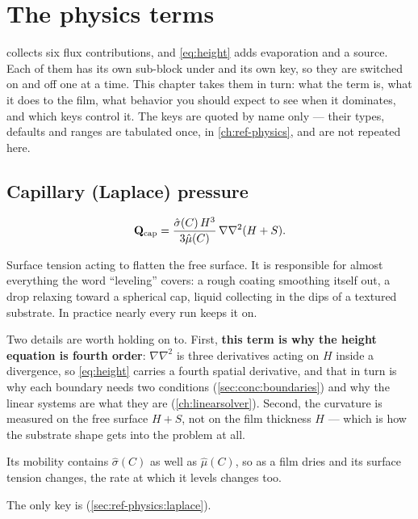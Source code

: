 \chapter{The physics terms}
\label{ch:terms}

 collects six flux contributions, and \cref{eq:height} adds
evaporation and a source. Each of them has its own sub-block under
 and its own  key, so they are switched on and off one
at a time. This chapter takes them in turn: what the term is, what it does to
the film, what behavior you should expect to see when it dominates, and which
keys control it. The keys are quoted by name only --- their types, defaults and
ranges are tabulated once, in \cref{ch:ref-physics}, and are not repeated here.

\section{Capillary (Laplace) pressure}
\label{sec:terms:laplace}

\begin{equation}\label{eq:q-cap}
  \mathbf{Q}_{\mathrm{cap}}
    = \frac{\hat{\sigma}(C)\,H^{3}}{3\hat{\mu}(C)}\,\nabla\nabla^{2}(H+S).
\end{equation}

Surface tension acting to flatten the free surface. It is responsible for
almost everything the word ``leveling'' covers: a rough coating smoothing
itself out, a drop relaxing toward a spherical cap, liquid collecting in the
dips of a textured substrate. In practice nearly every run keeps it on.

Two details are worth holding on to. First, \textbf{this term is why the height
equation is fourth order}: $\nabla\nabla^{2}$ is three derivatives acting on
$H$ inside a divergence, so \cref{eq:height} carries a fourth spatial
derivative, and that in turn is why each boundary needs two conditions
(\cref{sec:conc:boundaries}) and why the linear systems are what they are
(\cref{ch:linearsolver}). Second, the curvature is measured on the free surface
$H+S$, not on the film thickness $H$ --- which is how the substrate shape gets
into the problem at all.

Its mobility contains $\hat{\sigma}(C)$ as well as $\hat{\mu}(C)$, so as a film
dries and its surface tension changes, the rate at which it levels changes too.

The only key is 
(\cref{sec:ref-physics:laplace}).

